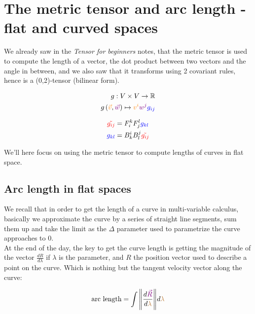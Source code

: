 \section{The metric tensor and arc length - flat and curved spaces}

We already saw in the \textit{Tensor for beginners} notes, that the metric tensor is used to compute 
the length of a vector, the dot product between two vectors and the angle in between, and we also saw that 
it transforms using 2 covariant rules, hence is a (0,2)-tensor (bilinear form).

\begin{align*}
    g: V \times V \to \mathbb{R}\\
    g \left(\begingroup\color{orange}\vec{v}\endgroup, \begingroup\color{violet}\vec{w}\endgroup\right) \mapsto  \begingroup\color{orange}v^i\endgroup \begingroup\color{violet}w^j\endgroup \begingroup\color{blue}g_{ij}\endgroup
\end{align*}

\begin{align*}
    \begingroup\color{red}\tilde{g_{ij}}\endgroup &= F^k_i F^l_j \begingroup\color{blue}g_{kl}\endgroup\\
    \begingroup\color{blue}g_{kl}\endgroup &= B^i_k B^j_l \begingroup\color{red}\tilde{g_{ij}}\endgroup
\end{align*}

We'll here focus on using the metric tensor to compute lengths of curves in flat space.\\

\subsection{Arc length in flat spaces}
We recall that in order to get the length of a curve in multi-variable calculus, basically we approximate 
the curve by a series of straight line segments, sum them up and take the limit as the $\Delta$ parameter used
to parametrize the curve approaches to 0.\\
At the end of the day, the key to get the curve length is getting the magnitude of the vector $\frac{dR}{d\lambda}$ if $\lambda$ is the parameter, and $R$ the 
position vector used to describe a point on the curve. Which is nothing but the tangent velocity vector along the curve:

\begin{align*}
    \text{arc length} = \int \norm{\frac{d\begingroup\color{violet}\vec{R}\endgroup}{d\begingroup\color{brown}\lambda\endgroup}}d\begingroup\color{brown}\lambda\endgroup 
\end{align*}

